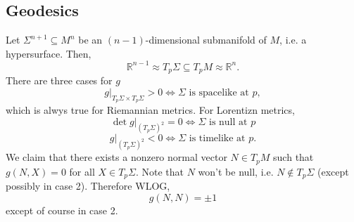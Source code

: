 \documentclass{article}
\numberwithin{equation}{section}
\begin{document}
\subsection{Geodesics}
Let $\Sigma^{n+1} \subseteq M^n$ be an $(n-1)$-dimensional submanifold of $M$, i.e. a hypersurface. Then,
\begin{equation*}
    \mathbb{R}^{n-1} \approx T_p\Sigma \subseteq T_pM \approx \mathbb{R}^n.
\end{equation*} 
There are three cases for $g$
\begin{equation*}
    g\bigg|_{T_p\Sigma \times T_p\Sigma} > 0 \iff \Sigma\text{ is spacelike at } p,
\end{equation*}
which is alwys true for Riemannian metrics. For Lorentizn metrics,
\begin{equation*}
    \det g|_{(T_p\Sigma)^2} = 0 \iff \Sigma \text{ is null at } p
\end{equation*}
\begin{equation*}
    g|_{(T_p\Sigma)^2} < 0 \iff \Sigma \text{ is timelike at } p.
\end{equation*}
We claim that there exists a nonzero normal vector $N\in T_pM$ such that $g(N,X) = 0$ for all $X\in T_p\Sigma.$ Note that $N$ won't be null, i.e. $N\notin T_p\Sigma$ (except possibly in case 2). Therefore WLOG,
\begin{equation*}
    g(N,N) = \pm 1
\end{equation*}
except of course in case 2.
\end{document}
